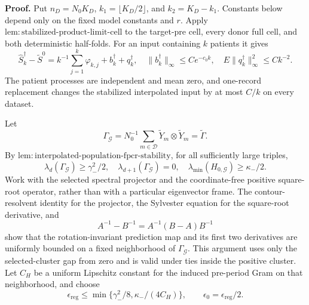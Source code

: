 \textbf{Proof.}
Put \(n_D=N_0K_D\), \(k_1=\lfloor K_D/2\rfloor\), and \(k_2=K_D-k_1\).  Constants below depend only on the fixed model constants and \(r\).  Apply \(\mathrm{lem:stabilized\mbox{-}product\mbox{-}limit\mbox{-}cell}\) to the target-pre cell, every donor full cell, and both deterministic half-folds.  For an input containing \(k\) patients it gives
\[
 \widehat S_k^\dagger-\widetilde S^0
 =k^{-1}\sum_{j=1}^k\varphi_{k,j}+b_k^\dagger+q_k^\dagger,
 \quad
 \|b_k^\dagger\|_\infty\le Ce^{-c_0k},
 \quad
 E\|q_k^\dagger\|_\infty^2\le Ck^{-2}.                 \tag{1}
\]
The patient processes are independent and mean zero, and one-record replacement changes the stabilized interpolated input by at most \(C/k\) on every dataset.

Let
\[
 \Gamma_{\mathcal G}=N_0^{-1}\sum_{m\in\mathcal D}
 \widetilde Y_m\otimes\widetilde Y_m=\widetilde\Gamma. \tag{2}
\]
By \(\mathrm{lem:interpolated\mbox{-}population\mbox{-}fpcr\mbox{-}stability}\), for all sufficiently large triples,
\[
 \lambda_d(\Gamma_{\mathcal G})\ge\gamma_-^2/2,
 \quad \lambda_{d+1}(\Gamma_{\mathcal G})=0,
 \quad \lambda_{\min}(H_{0,\mathcal G})\ge\kappa_-/2. \tag{3}
\]
Work with the selected spectral projector and the coordinate-free positive square-root operator, rather than with a particular eigenvector frame.  The contour-resolvent identity for the projector, the Sylvester equation for the square-root derivative, and
\[
 A^{-1}-B^{-1}=A^{-1}(B-A)B^{-1}                       \tag{4}
\]
show that the rotation-invariant prediction map and its first two derivatives are uniformly bounded on a fixed neighborhood of \(\Gamma_{\mathcal G}\).  This argument uses only the selected-cluster gap from zero and is valid under ties inside the positive cluster.  Let \(C_H\) be a uniform Lipschitz constant for the induced pre-period Gram on that neighborhood, and choose
\[
 \epsilon_{\mathrm{reg}}\le
 \min\{\gamma_-^2/8,\kappa_-/(4C_H)\},
 \qquad \epsilon_0=\epsilon_{\mathrm{reg}}/2.           \tag{5}
\]

